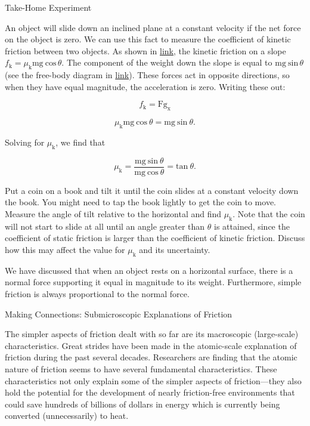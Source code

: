 \documentclass[
]{book}
\newenvironment{note}{}{}
\begin{document}
\hypertarget{fs-id1244089}{}
\begin{note}

Take-Home Experiment

An object will slide down an inclined plane at a constant velocity if
the net force on the object is zero. We can use this fact to measure the
coefficient of kinetic friction between two objects. As shown in
\protect\hyperlink{fs-id1704828}{link}, the kinetic friction on a
slope
\({{f_{\text{k}} = \mu_{\text{k}}}\text{mg}\ \text{cos}\,\theta}{}\). The
component of the weight down the slope is equal to
\({\text{mg}\ \text{sin}\,\theta}{}\) (see the free-body diagram in
\protect\hyperlink{import-auto-id1165296217411}{link}). These
forces act in opposite directions, so when they have equal magnitude,
the acceleration is zero. Writing these out:

\leavevmode\hypertarget{eip-387}{}%
\[{f_{\text{k}} = \text{Fg}_{\text{x}}}{}\]

\leavevmode\hypertarget{eip-368}{}%
\[{{\mu_{\text{k}}\text{mg}\ \text{cos}\ {\theta = \text{mg}}\ \text{sin}\ \theta}.}{}\]

Solving for \(\mu_{\text{k}}{}\), we find that

\leavevmode\hypertarget{eip-680}{}%
\[{{{{\mu_{\text{k}} = \frac{\text{mg}\ \text{sin}\ \theta}{\text{mg}\ \text{cos}\ \theta}} = \text{tan}}\ \theta}.}{}\]

Put a coin on a book and tilt it until the coin slides at a constant
velocity down the book. You might need to tap the book lightly to get
the coin to move. Measure the angle of tilt relative to the horizontal
and find \(\mu_{\text{k}}{}\). Note that the coin will not start to slide
at all until an angle greater than \(\theta\) is attained, since the
coefficient of static friction is larger than the coefficient of kinetic
friction. Discuss how this may affect the value for \(\mu_{\text{k}}{}\)
and its uncertainty.

\end{note}

We have discussed that when an object rests on a horizontal surface,
there is a normal force supporting it equal in magnitude to its weight.
Furthermore, simple friction is always proportional to the normal force.

\hypertarget{fs-id1529687}{}
\begin{note}

Making Connections: Submicroscopic Explanations of Friction

The simpler aspects of friction dealt with so far are its macroscopic
(large-scale) characteristics. Great strides have been made in the
atomic-scale explanation of friction during the past several decades.
Researchers are finding that the atomic nature of friction seems to have
several fundamental characteristics. These characteristics not only
explain some of the simpler aspects of friction---they also hold the
potential for the development of nearly friction-free environments that
could save hundreds of billions of dollars in energy which is currently
being converted (unnecessarily) to heat.

\end{note}
\end{document}
